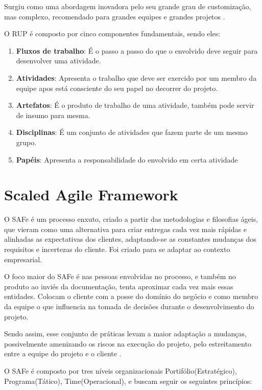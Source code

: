Surgiu como uma abordagem inovadora pelo seu grande grau de customização, mas complexo,
recomendado para grandes equipes e grandes projetos \cite{KRUCHTEN}.

O RUP é composto por cinco componentes fundamentais, sendo eles:

\begin{enumerate}
  \item \textbf{Fluxos de trabalho}: É o passo a passo do que o envolvido deve seguir para
  desenvolver uma atividade.
  \item \textbf{Atividades}: Apresenta o trabalho que deve ser exercido por um membro da equipe
  apos está consciente do seu papel no decorrer do projeto.
  \item \textbf{Artefatos}: É o produto de trabalho de uma atividade, também pode servir de insumo para mesma.
  \item \textbf{Disciplinas}: É um conjunto de atividades que fazem parte de um mesmo grupo.
  \item \textbf{Papéis}: Apresenta a responsabilidade do envolvido em certa atividade
\end{enumerate}

\section{Scaled Agile Framework}

O SAFe é um processo enxuto, criado a partir das metodologias e filosofias ágeis,
que vieram como uma alternativa para criar entregas cada vez mais rápidas e alinhadas
as expectativas dos clientes, adaptando-se as constantes mudanças dos requisitos
e incertezas do cliente. Foi criado para se adaptar ao contexto empresarial.

O foco maior do SAFe é nas pessoas envolvidas no processo, e também no produto ao
inviés da documentação, tenta aproximar cada vez mais essas entidades. Colocam o
cliente com a posse do domínio do negócio e como membro da equipe o que influencia
na tomada de decisões durante o desenvolvimento do projeto.

Sendo assim, esse conjunto de práticas levam a maior adaptação a mudanças, possivelmente
amenizando os riscos na execução do projeto, pelo estreitamento entre a equipe do projeto
e o cliente \cite{BOEHM}.

O SAFe é composto por tres níveis organizacionais Portifólio(Estratégico),
Programa(Tático), Time(Operacional), e buscam seguir os seguintes princípios:

